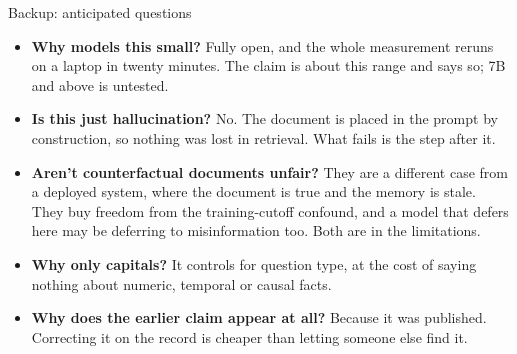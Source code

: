 \documentclass[aspectratio=169]{beamer}
\begin{document}
\begin{frame}{Backup: anticipated questions}
  \vspace{0.2cm}
  \small
  \begin{itemize}\setlength\itemsep{0.75em}
    \item \textbf{Why models this small?} Fully open, and the whole measurement
          reruns on a laptop in twenty minutes. The claim is about this range and
          says so; 7B and above is untested.
    \item \textbf{Is this just hallucination?} No. The document is placed in the
          prompt by construction, so nothing was lost in retrieval. What fails is
          the step after it.
    \item \textbf{Aren't counterfactual documents unfair?} They are a different
          case from a deployed system, where the document is true and the memory
          is stale. They buy freedom from the training-cutoff confound, and a
          model that defers here may be deferring to misinformation too. Both are
          in the limitations.
    \item \textbf{Why only capitals?} It controls for question type, at the cost
          of saying nothing about numeric, temporal or causal facts.
    \item \textbf{Why does the earlier claim appear at all?} Because it was
          published. Correcting it on the record is cheaper than letting someone
          else find it.
  \end{itemize}
\end{frame}
\end{document}
